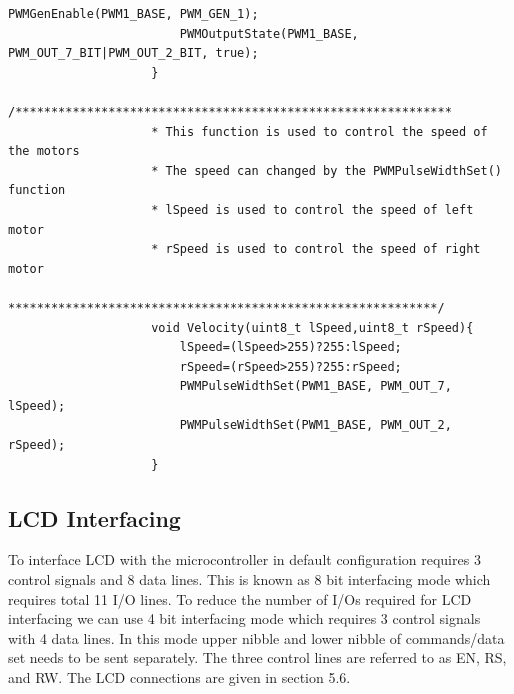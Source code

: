\documentclass[a4paper,12pt,oneside]{article}
\begin{document}
\begin{lstlisting}[style=CStyle]
						PWMGenEnable(PWM1_BASE, PWM_GEN_1);
						PWMOutputState(PWM1_BASE, PWM_OUT_7_BIT|PWM_OUT_2_BIT, true);
					}
					/*************************************************************
					* This function is used to control the speed of the motors
					* The speed can changed by the PWMPulseWidthSet() function
					* lSpeed is used to control the speed of left motor
					* rSpeed is used to control the speed of right motor
					************************************************************/
					void Velocity(uint8_t lSpeed,uint8_t rSpeed){
						lSpeed=(lSpeed>255)?255:lSpeed;
						rSpeed=(rSpeed>255)?255:rSpeed;
						PWMPulseWidthSet(PWM1_BASE, PWM_OUT_7, lSpeed);
						PWMPulseWidthSet(PWM1_BASE, PWM_OUT_2, rSpeed);
					}
				\end{lstlisting}
				
		\subsection{\huge \textbf{LCD Interfacing}}
			{To interface LCD with the microcontroller in default configuration requires 3 control signals and 8 data lines. This is known as 8 bit interfacing mode which requires total 11 I/O lines. To reduce the number  of  I/Os  required for  LCD interfacing we can use 4 bit  interfacing mode  which requires  3 control  signals  with 4 data lines.  In this  mode upper  nibble and lower  nibble of commands/data set needs to be sent separately. The three control lines are referred to as EN, RS, and RW. The LCD connections are given in section 5.6.}
			
\end{document}
